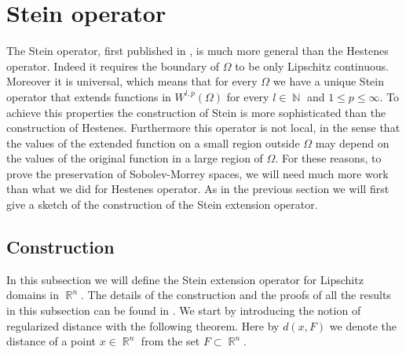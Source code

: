 \documentclass[12pt]{article}
\theoremstyle{definition}
\DeclareMathOperator\rr{\mathbb{R}}
\DeclareMathOperator\nn{\mathbb{N}}
\begin{document}
\section{Stein operator}
The Stein operator, first published in \cite{stein}, is much more general than the Hestenes operator. Indeed it requires the boundary of $\Omega$ to be only Lipschitz continuous. Moreover it is universal, which means that for every $\Omega$ we have a unique Stein operator that extends functions in $W^{l,p}(\Omega)$ for every $l\in \nn$ and $1\le p \le \infty.$ To achieve this properties the construction of Stein is more sophisticated than the construction of Hestenes. Furthermore this operator is not local, in the sense that the values of the extended function on a small region outside $\Omega$ may depend on the values of the original function in a large region of $\Omega$. For these reasons, to prove the preservation of Sobolev-Morrey spaces, we will need much more work than what we did for Hestenes operator. As in the previous section we will first give a sketch of the construction of the Stein extension operator. 



\subsection{Construction}
In this subsection we will define the Stein extension operator for Lipschitz domains in $\rr^n$. The details of the construction and the proofs of all the results in this subsection can be found in \cite[Section 2-3, Ch. VI]{stein}. We start by introducing the notion of regularized distance with the following theorem. Here by $d(x,F)$ we denote the distance of a point $x \in \rr^n$ from the set $F\subset \rr^n.$ 
\end{document}
